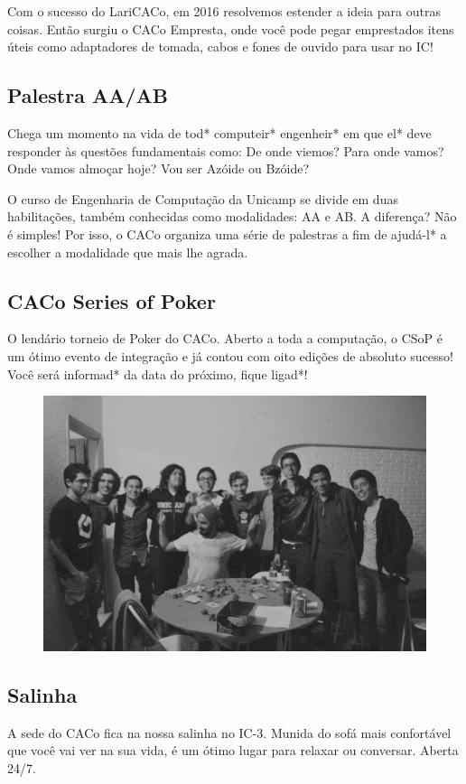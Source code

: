 Com o sucesso do LariCACo, em 2016 resolvemos estender a ideia para outras
coisas. Então surgiu o CACo Empresta, onde você pode pegar emprestados itens
úteis como adaptadores de tomada, cabos e fones de ouvido para usar no IC!

\subsection{Palestra AA/AB}

Chega um momento na vida de tod* computeir* engenheir* em que el* deve responder
às questões fundamentais como: De onde viemos? Para onde vamos? Onde vamos
almoçar hoje? Vou ser Azóide ou Bzóide?

O curso de Engenharia de Computação da Unicamp se divide em duas habilitações,
também conhecidas como modalidades: AA e AB. A diferença? Não é simples! Por
isso, o CACo organiza uma série de palestras a fim de ajudá-l* a escolher a
modalidade que mais lhe agrada.

\subsection{CACo Series of Poker}

O lendário torneio de Poker do CACo. Aberto a toda a computação, o CSoP é um
ótimo evento de integração e já contou com oito edições de absoluto sucesso!
Você será informad* da data do próximo, fique ligad*!

\begin{figure}[H]
    \centering
    \includegraphics[width=.45\textwidth]{img/alem_da_graduacao/caco_poker.jpg}
\end{figure}

\subsection{Salinha}

A sede do CACo fica na nossa salinha no IC-3. Munida do sofá mais confortável
que você vai ver na sua vida, é um ótimo lugar para relaxar ou conversar.
Aberta 24/7.

